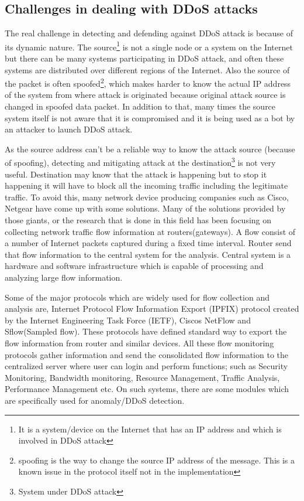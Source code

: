 \documentclass[12pt,oneside,a4paper]{article}
\begin{document}
\subsection{Challenges in dealing with DDoS attacks}
The real challenge in detecting and defending against DDoS attack is because of its dynamic nature. The source\footnote{It is a system/device on the Internet that has an IP address and which is involved in DDoS attack} is not a single node or a system on the Internet but there can be many systems participating in DDoS attack, and often these systems are distributed over different regions of the Internet. Also the source of the packet is often spoofed\footnote{spoofing is the way to change the source IP address of the message. This is a known issue in the protocol itself not in the implementation}\cite{ip-spoofing}, which makes harder to know the actual IP address of the system from where attack is originated because original attack source is changed in spoofed data packet. In addition to that, many times the source system itself is not aware that it is compromised and it is being used as a bot\cite{bot} by an attacker to launch DDoS attack.

As the source address can't be a reliable way to know the attack source (because of spoofing), detecting and mitigating attack at the destination\footnote{System under DDoS attack} is not very useful. Destination may know that the attack is happening but to stop it happening it will have to block all the incoming traffic including the legitimate traffic. To avoid this, many network device producing companies such as Cisco, Netgear have come up with some solutions. Many of the solutions provided by those giants, or the research that is done in this field has been focusing on collecting network traffic flow information\cite{network-traffic-flow} at routers(gateways). A flow consist of a number of Internet packets captured during a fixed time interval. Router send that flow information to the central system for the analysis. Central system is a hardware and software infrastructure which is capable of processing and analyzing large flow information.\par

Some of the major protocols which are widely used for flow collection and analysis are, Internet Protocol Flow Information Export (IPFIX) protocol created by the Internet Engineering Task Force (IETF), Ciscos NetFlow\cite{cisco-netflow} and Sflow(Sampled flow)\cite{sflow}. These protocols have defined standard way to export the flow information from router and similar devices. All these flow monitoring protocols gather information and send the consolidated flow information to the centralized server where user can login and perform functions; such as Security Monitoring, Bandwidth monitoring, Resource Management, Traffic Analysis, Performance Management etc. On such systems, there are some modules which are specifically used for anomaly/DDoS detection.\par
\end{document}
